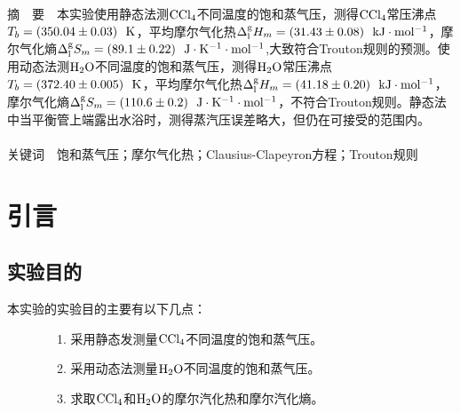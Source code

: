 \documentclass[12pt]{article}
\begin{document}
\begin{titlepage}
\begin{center}
            \begin{tabular*}{\textwidth}{c}
                \\ %
                \\ %
                \hline %
            \end{tabular*}
        \end{center}
        \textsf{\textcolor{BrickRed}{摘\ \ 要}}\ \ 本实验使用静态法测$\rm CCl_{4}$不同温度的饱和蒸气压，测得$\rm CCl_{4}$常压沸点$T_{b}=(350.04\pm 0.03)\ \ {\rm K}$，平均摩尔气化热$\Delta^{\rm g}_{\rm l}H_{m}=(31.43\pm 0.08)\ \ {\rm kJ\cdot mol^{-1}}$，摩尔气化熵$\Delta^{\rm g}_{\rm l}S_{m}=(89.1\pm 0.22)\ \ {\rm J\cdot K^{-1}\cdot mol^{-1}}$,大致符合Trouton规则的预测。使用动态法测$\rm H_{2}O$不同温度的饱和蒸气压，测得$\rm H_{2}O$常压沸点$T_{b}=(372.40\pm 0.005)\ \ {\rm K}$，平均摩尔气化热$\Delta^{\rm g}_{\rm l}H_{m}=(41.18\pm 0.20)\ \ {\rm kJ\cdot mol^{-1}}$，摩尔气化熵$\Delta^{\rm g}_{\rm l}S_{m}=(110.6\pm 0.2)\ \ {\rm J\cdot K^{-1}\cdot mol^{-1}}$，不符合Trouton规则。静态法中当平衡管上端露出水浴时，测得蒸汽压误差略大，但仍在可接受的范围内。
        \\
        \\
        \textsf{\textcolor{BrickRed}{关键词}}\ \ 饱和蒸气压；摩尔气化热；Clausius-Clapeyron方程；Trouton规则
    \end{titlepage}

    \section{引言}
		\subsection{实验目的}
			本实验的实验目的主要有以下几点\cite{physchemlab}：\par
			\ \ \ \ \ \ \ \ 1. 采用静态发测量$\rm CCl_{4}$不同温度的饱和蒸气压。\par
			\ \ \ \ \ \ \ \	2. 采用动态法测量$\rm H_{2}O$不同温度的饱和蒸气压。\par
			\ \ \ \ \ \ \ \	3. 求取$\rm CCl_{4}$和$\rm H_{2}O$的摩尔汽化热和摩尔汽化熵。\par
\end{document}
